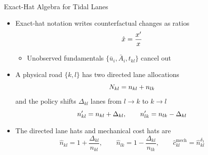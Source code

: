 \documentclass[11pt,aspectratio=169]{beamer}
\begin{document}
\begin{frame}{Exact-Hat Algebra for Tidal Lanes}
\begin{itemize}
  \item Exact-hat notation writes counterfactual changes as ratios
  \vspace{-1em}\begin{equation}
    \hat{x}=\frac{x'}{x}
  \vspace{-2em}\end{equation}
  \begin{itemize}
    \item Unobserved fundamentals $\{\bar u_i,\bar A_i,t_{kl}\}$ cancel out
  \end{itemize}
  \item A physical road $\{k,l\}$ has two directed lane allocations
  \vspace{-1em}\begin{equation}
    N_{kl}=n_{kl}+n_{lk}
  \vspace{-1em}\end{equation}
  and the policy shifts $\Delta_{kl}$ lanes from $l\to k$ to $k\to l$
  \vspace{-1em}\begin{equation}
    n'_{kl}=n_{kl}+\Delta_{kl},
    \qquad
    n'_{lk}=n_{lk}-\Delta_{kl}
  \vspace{-1em}\end{equation}
  \item The directed lane hats and mechanical cost hats are
  \vspace{-0.5em}\begin{equation}
    \hat n_{kl}=1+\frac{\Delta_{kl}}{n_{kl}},
    \qquad
    \hat n_{lk}=1-\frac{\Delta_{kl}}{n_{lk}},
    \qquad
    \hat c_{kl}^{\mathrm{mech}}=\hat n_{kl}^{\delta_1}
  \end{equation}
\end{itemize}
\end{frame}
\end{document}
